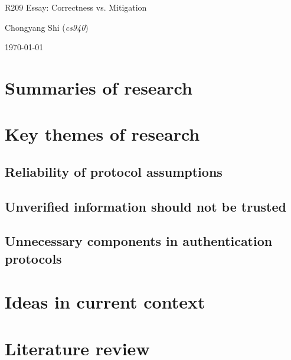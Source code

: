 \documentclass[11pt]{article}
\begin{document}
\centerline{\Large R209 Essay:  Correctness vs. Mitigation}
\vspace{2em}
\centerline{\large Chongyang Shi (\emph{cs940})}
\vspace{1em}
\centerline{\large \today}
\vspace{1em}

\section{Summaries of research}

\section{Key themes of research}

\subsection{Reliability of protocol assumptions}

\subsection{Unverified information should not be trusted}

\subsection{Unnecessary components in authentication protocols}

\section{Ideas in current context}

\section{Literature review}



\footnotesize{}
\end{document}
